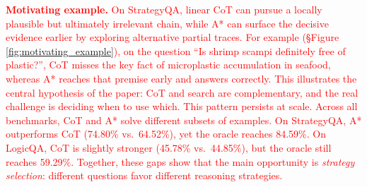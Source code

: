 \documentclass[11pt]{article}
\begin{document}

\textcolor{red}{\textbf{Motivating example.} On StrategyQA, linear CoT can pursue a locally plausible but ultimately irrelevant chain, while A* can surface the decisive evidence earlier by exploring alternative partial traces. For example (\S Figure \ref{fig:motivating_example}), on the question ``Is shrimp scampi definitely free of plastic?'', CoT misses the key fact of microplastic accumulation in seafood, whereas A* reaches that premise early and answers correctly. This illustrates the central hypothesis of the paper: CoT and search are complementary, and the real challenge is deciding when to use which. This pattern persists at scale. Across all benchmarks, CoT and A* solve different subsets of examples. On StrategyQA, A* outperforms CoT (74.80\% vs.\ 64.52\%), yet the oracle reaches 84.59\%. On LogicQA, CoT is slightly stronger (45.78\% vs.\ 44.85\%), but the oracle still reaches 59.29\%. Together, these gaps show that the main opportunity is \emph{strategy selection}: different questions favor different reasoning strategies.}


\end{document}
